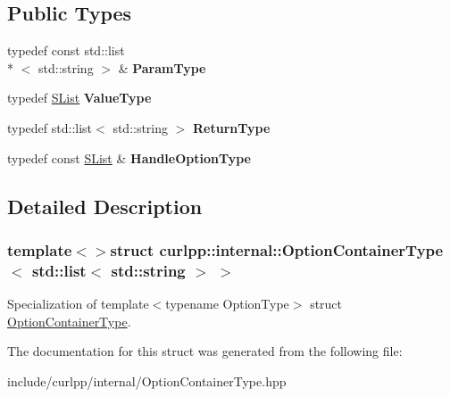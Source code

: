 \subsection*{Public Types}
\begin{DoxyCompactItemize}
\item 
\hypertarget{structcurlpp_1_1internal_1_1OptionContainerType_3_01std_1_1list_3_01std_1_1string_01_4_01_4_aec5cca415b8e23a9a255b7af2906e503}{typedef const std\-::list\\*
$<$ std\-::string $>$ \& {\bfseries Param\-Type}}\label{structcurlpp_1_1internal_1_1OptionContainerType_3_01std_1_1list_3_01std_1_1string_01_4_01_4_aec5cca415b8e23a9a255b7af2906e503}

\item 
\hypertarget{structcurlpp_1_1internal_1_1OptionContainerType_3_01std_1_1list_3_01std_1_1string_01_4_01_4_ae7bdcfcfab6583be30470e36e4d2cbb3}{typedef \hyperlink{classcurlpp_1_1internal_1_1SList}{S\-List} {\bfseries Value\-Type}}\label{structcurlpp_1_1internal_1_1OptionContainerType_3_01std_1_1list_3_01std_1_1string_01_4_01_4_ae7bdcfcfab6583be30470e36e4d2cbb3}

\item 
\hypertarget{structcurlpp_1_1internal_1_1OptionContainerType_3_01std_1_1list_3_01std_1_1string_01_4_01_4_ad6db956a9d868487879049c12b086acb}{typedef std\-::list$<$ std\-::string $>$ {\bfseries Return\-Type}}\label{structcurlpp_1_1internal_1_1OptionContainerType_3_01std_1_1list_3_01std_1_1string_01_4_01_4_ad6db956a9d868487879049c12b086acb}

\item 
\hypertarget{structcurlpp_1_1internal_1_1OptionContainerType_3_01std_1_1list_3_01std_1_1string_01_4_01_4_a00585f093a06ac276ab2d74a75750a04}{typedef const \hyperlink{classcurlpp_1_1internal_1_1SList}{S\-List} \& {\bfseries Handle\-Option\-Type}}\label{structcurlpp_1_1internal_1_1OptionContainerType_3_01std_1_1list_3_01std_1_1string_01_4_01_4_a00585f093a06ac276ab2d74a75750a04}

\end{DoxyCompactItemize}


\subsection{Detailed Description}
\subsubsection*{template$<$$>$struct curlpp\-::internal\-::\-Option\-Container\-Type$<$ std\-::list$<$ std\-::string $>$ $>$}

Specialization of template$<$typename Option\-Type$>$ struct \hyperlink{structcurlpp_1_1internal_1_1OptionContainerType}{Option\-Container\-Type}. 

The documentation for this struct was generated from the following file\-:\begin{DoxyCompactItemize}
\item 
include/curlpp/internal/Option\-Container\-Type.\-hpp\end{DoxyCompactItemize}
